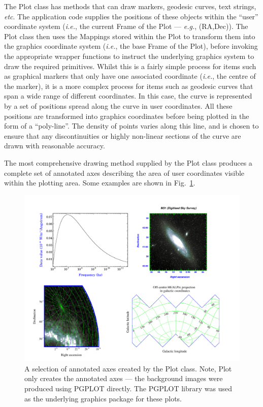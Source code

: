 \documentclass[final,authoryear,5p,times,twocolumn]{elsarticle}
\begin{document}
The Plot class has methods that can draw markers, geodesic curves, text
strings, \emph{etc}. The application code supplies the positions of these
objects within the ``user'' coordinate system (\emph{i.e.}, the current
Frame of the Plot --- \emph{e.g.}, (RA,Dec)). The Plot class then uses the
Mappings stored within the Plot to transform them into the graphics
coordinate system (\emph{i.e.}, the base Frame of the Plot), before
invoking the appropriate wrapper functions to instruct the underlying
graphics system to draw the required primitives. Whilst this is a fairly
simple process for items such as graphical markers that only have one
associated coordinate (\emph{i.e.}, the centre of the marker), it is a
more complex process for items such as geodesic curves that span a wide
range of different coordinates. In this case, the curve is represented by
a set of positions spread along the curve in user coordinates. All these
positions are transformed into graphics coordinates before being plotted
in the form of a ``poly-line''. The density of points varies along this
line, and is chosen to ensure that any discontinuities or highly
non-linear sections of the curve are drawn with reasonable accuracy.

The most comprehensive drawing method supplied by the Plot class produces
a complete set of annotated axes describing the area of user coordinates
visible within the plotting area. Some examples are shown in
Fig.~\ref{fig:2dplots}.

\begin{figure}[ht]
\centering
\includegraphics[width=\textwidth]{2dplots}
\caption{A selection of annotated axes created by the Plot class. Note,
Plot only creates the annotated axes --- the background images were
produced using PGPLOT directly. The PGPLOT library was used as the
underlying graphics package for these plots.}
\label{fig:2dplots}
\end{figure}
\end{document}
